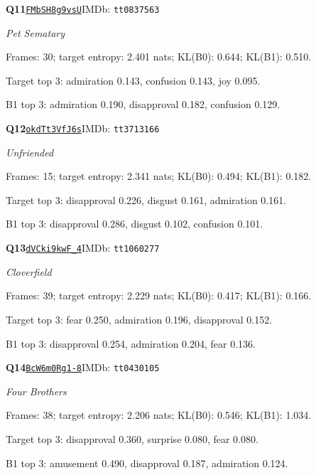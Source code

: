 \par\noindent\begin{minipage}{\textwidth}\small
\textbf{Q11}\quad\href{https://www.youtube.com/watch?v=FMbSH8g9vsU}{\texttt{FMbSH8g9vsU}}\quad IMDb: \texttt{tt0837563}\par
\textit{Pet Sematary}\par
Frames: 30; target entropy: 2.401 nats; KL(B0): 0.644; KL(B1): 0.510.\par
Target top 3: admiration 0.143, confusion 0.143, joy 0.095.\par
B1 top 3: admiration 0.190, disapproval 0.182, confusion 0.129.\par
\end{minipage}\par\medskip
\par\noindent\begin{minipage}{\textwidth}\small
\textbf{Q12}\quad\href{https://www.youtube.com/watch?v=okdTt3VfJ6s}{\texttt{okdTt3VfJ6s}}\quad IMDb: \texttt{tt3713166}\par
\textit{Unfriended}\par
Frames: 15; target entropy: 2.341 nats; KL(B0): 0.494; KL(B1): 0.182.\par
Target top 3: disapproval 0.226, disgust 0.161, admiration 0.161.\par
B1 top 3: disapproval 0.286, disgust 0.102, confusion 0.101.\par
\end{minipage}\par\medskip
\par\noindent\begin{minipage}{\textwidth}\small
\textbf{Q13}\quad\href{https://www.youtube.com/watch?v=dVCki9kwF_4}{\texttt{dVCki9kwF\_4}}\quad IMDb: \texttt{tt1060277}\par
\textit{Cloverfield}\par
Frames: 39; target entropy: 2.229 nats; KL(B0): 0.417; KL(B1): 0.166.\par
Target top 3: fear 0.250, admiration 0.196, disapproval 0.152.\par
B1 top 3: disapproval 0.254, admiration 0.204, fear 0.136.\par
\end{minipage}\par\medskip
\par\noindent\begin{minipage}{\textwidth}\small
\textbf{Q14}\quad\href{https://www.youtube.com/watch?v=BcW6m0Rg1-8}{\texttt{BcW6m0Rg1-8}}\quad IMDb: \texttt{tt0430105}\par
\textit{Four Brothers}\par
Frames: 38; target entropy: 2.206 nats; KL(B0): 0.546; KL(B1): 1.034.\par
Target top 3: disapproval 0.360, surprise 0.080, fear 0.080.\par
B1 top 3: amusement 0.490, disapproval 0.187, admiration 0.124.\par
\end{minipage}\par\medskip
